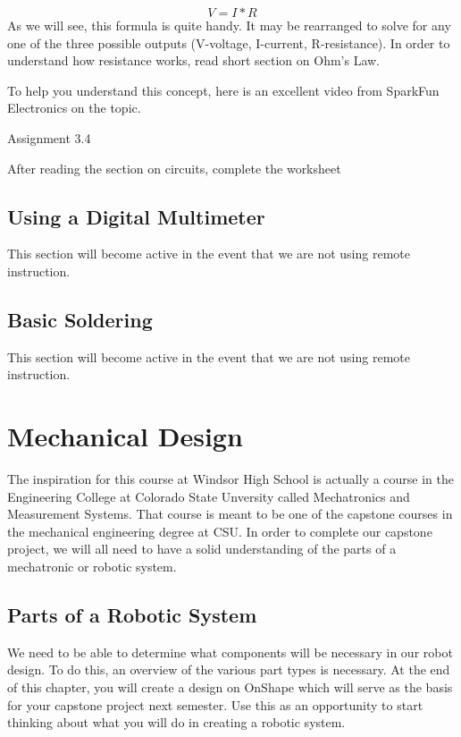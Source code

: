 \documentclass[
]{book}
\begin{document}
\[V = I * R\]
As we will see, this formula is quite handy. It may be rearranged to solve for any one of the three possible outputs (V-voltage, I-current, R-resistance). In order to understand how resistance works, read short section on Ohm's Law.

To help you understand this concept, here is an excellent video from SparkFun Electronics on the topic.

Assignment 3.4

After reading the section on circuits, complete the worksheet

\hypertarget{using-a-digital-multimeter}{%
\section{Using a Digital Multimeter}\label{using-a-digital-multimeter}}

This section will become active in the event that we are not using remote instruction.

\hypertarget{basic-soldering}{%
\section{Basic Soldering}\label{basic-soldering}}

This section will become active in the event that we are not using remote instruction.

\hypertarget{mechanical-design}{%
\chapter{Mechanical Design}\label{mechanical-design}}

The inspiration for this course at Windsor High School is actually a course in the Engineering College at Colorado State Unversity called Mechatronics and Measurement Systems. That course is meant to be one of the capstone courses in the mechanical engineering degree at CSU. In order to complete our capstone project, we will all need to have a solid understanding of the parts of a mechatronic or robotic system.

\hypertarget{parts-of-a-robotic-system}{%
\section{Parts of a Robotic System}\label{parts-of-a-robotic-system}}

We need to be able to determine what components will be necessary in our robot design. To do this, an overview of the various part types is necessary. At the end of this chapter, you will create a design on OnShape which will serve as the basis for your capstone project next semester. Use this as an opportunity to start thinking about what you will do in creating a robotic system.
\end{document}
